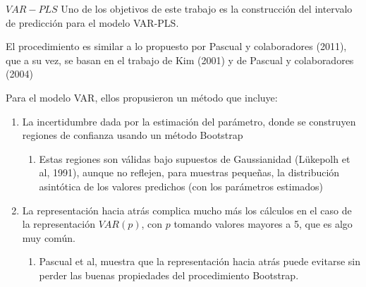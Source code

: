 \documentclass{beamer}
\newcommand{\?}{?`}
\begin{document}
\begin{frame}{$VAR-PLS$}
  Uno de los objetivos de este trabajo es la construcci\'on del
  intervalo de predicci\'on para el modelo VAR-PLS.

  El procedimiento es similar a lo propuesto por Pascual y
  colaboradores (2011), que a su vez, se basan en el
  trabajo de Kim (2001) y de Pascual y colaboradores (2004)

  Para el modelo VAR, ellos propusieron un m\'etodo que incluye:
  \begin{enumerate}
  \item La incertidumbre dada por la estimaci\'on del par\'ametro,
    donde se construyen regiones de confianza usando un m\'etodo Bootstrap
    \begin{enumerate}
    \item Estas regiones son v\'alidas bajo supuestos de Gaussianidad
      (L\"ukepolh et al, 1991), aunque no reflejen, para muestras
      peque\~nas, la distribuci\'on asint\'otica de los valores
      predichos (con los par\'ametros estimados)
    \end{enumerate}
  \item La representaci\'on hacia atr\'as complica mucho m\'as los
    c\'alculos en el caso de la representaci\'on $VAR(p)$, con $p$
    tomando valores mayores a 5, que es algo muy com\'un.
    \begin{enumerate}
    \item Pascual et al, muestra que la representaci\'on hacia atr\'as
      puede evitarse sin perder las buenas propiedades del
      procedimiento Bootstrap.
    \end{enumerate}
  \end{enumerate}
\end{frame}
\end{document}
